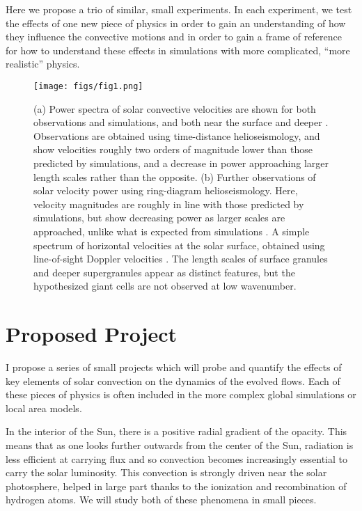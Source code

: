 \documentclass[aasms,12pt]{article}
\begin{document}
Here we propose a trio of similar, small experiments.  In each experiment, we test the effects
of one new piece of physics in order to gain an understanding of how they influence the convective
motions and in order to gain a frame of reference for how to understand these effects in 
simulations with more complicated, ``more realistic'' physics.


\begin{figure}[t]
\centering
\texttt{[image: figs/fig1.png]}
\caption{(a) Power spectra of solar convective velocities are shown for both observations and simulations,
and both near the surface and deeper \cite{hanasoge&all2012}.  Observations are obtained
using time-distance helioseismology, and show velocities roughly two orders of magnitude lower
than those predicted by simulations, and a decrease in power approaching larger length
scales rather than the opposite. (b) Further observations of solar velocity power  using
ring-diagram helioseismology.  Here, velocity magnitudes are roughly in line with those
predicted by simulations, but show decreasing power as larger scales are approached, unlike
what is expected from simulations \cite{greer&all2015}.  A simple spectrum of horizontal
velocities at the solar surface, obtained using line-of-sight Doppler velocities \cite{hathaway&all2015}.
The length scales of surface granules and deeper supergranules appear as distinct features, but
the hypothesized giant cells are not observed at low wavenumber.
        \label{fig:fig1}}
\end{figure}

\section{Proposed Project}
I propose a series of small projects which will probe and quantify the effects of key
elements of solar convection on the dynamics of the evolved flows.  Each of these pieces
of physics is often included in the more complex global simulations or local area models.

In the interior of the Sun, there is a positive radial gradient of the opacity.  This means
that as one looks further outwards from the center of the Sun, radiation is less efficient at
carrying flux and so convection becomes increasingly essential to carry the solar luminosity.
This convection is strongly driven near the solar photosphere, helped in large part thanks to
the ionization and recombination of hydrogen atoms. We will study both of these phenomena in
small pieces.  
\end{document}
